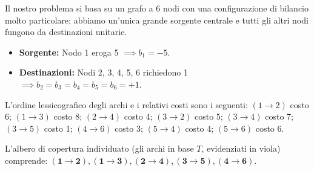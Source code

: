 \documentclass[12pt, a4paper]{article}
\begin{document}
	Il nostro problema si basa su un grafo a 6 nodi con una configurazione di bilancio molto particolare: abbiamo un'unica grande sorgente centrale e tutti gli altri nodi fungono da destinazioni unitarie.
	\begin{itemize}[label=\textcolor{titlecolor}{\Large\textbullet}, itemsep=2pt, leftmargin=1.5cm]
		\item \textbf{Sorgente:} Nodo 1 eroga 5 $\implies b_1 = -5$.
		\item \textbf{Destinazioni:} Nodi 2, 3, 4, 5, 6 richiedono 1 $\implies b_2 = b_3 = b_4 = b_5 = b_6 = +1$.
	\end{itemize}
	L'ordine lessicografico degli archi e i relativi costi sono i seguenti: $(1\to2)$ costo 6; $(1\to3)$ costo 8; $(2\to4)$ costo 4; $(3\to2)$ costo 5; $(3\to4)$ costo 7; $(3\to5)$ costo 1; $(4\to6)$ costo 3; $(5\to4)$ costo 4; $(5\to6)$ costo 6.
	
	L'albero di copertura individuato (gli archi in base $T$, evidenziati in viola) comprende: $\mathbf{(1\to2), (1\to3), (2\to4), (3\to5), (4\to6)}$.
	
\end{document}

